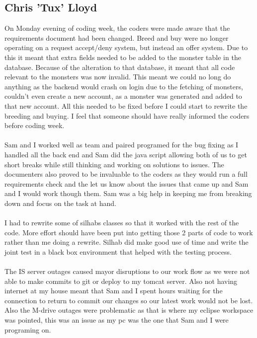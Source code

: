 \documentclass{project}
\begin{document}
\subsection{Chris 'Tux' Lloyd}
On Monday evening of coding week, the coders were made aware that the requirements document had been changed. Breed and buy were no longer operating on a request accept/deny system, but instead an offer system. Due to this it meant that extra fields needed to be added to the monster table in the database. Because of the alteration to that database, it meant that all code relevant to the monsters was now invalid. This meant we could no long do anything as the backend would crash on login due to the fetching of monsters, couldn’t even create a new account, as a monster was generated and added to that new account. All this needed to be fixed before I could start to rewrite the breeding and buying. I feel that someone should have really informed the coders before coding week.
\\\\
Sam and I worked well as team and paired programed for the bug fixing as I handled all the back end and Sam did the java script allowing both of us to get short breaks while still thinking and working on solutions to issues. The documenters also proved to be invaluable to the coders as they would run a full requirements check and the let us know about the issues that came up and Sam and I would work though them. Sam was a big help in keeping me from breaking down and focus on the task at hand.
\\\\
I had to rewrite some of silhabs classes so that it worked with the rest of the code. More effort should have been put into getting those 2 parts of code to work rather than me doing a rewrite. Silhab did make good use of time and write the joint test in a black box environment that helped with the testing process.
\\\\
The IS server outages caused mayor disruptions to our work flow as we were not able to make commits to git or deploy to my tomcat server. Also not having internet at my house meant that Sam and I spent hours waiting for the connection to return to commit our changes so our latest work would not be lost. Also the M-drive outages were problematic as that is where my eclipse workspace was pointed, this was an issue as my pc was the one that Sam and I were programing on.
\\\\
\end{document}
